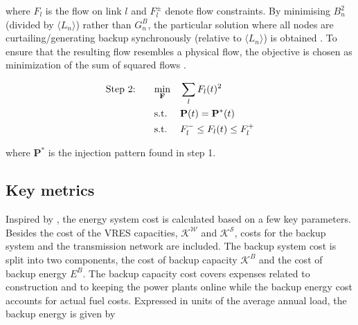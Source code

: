 \documentclass[a4paper, 5p, sort&compress]{elsarticle}%
\newcommand{\mean}[1]{\langle #1 \rangle}
\begin{document}
where $F_{l}$ is the flow on link $l$ and $F_{l}^{\pm}$ denote flow
constraints. By minimising $B_{n}^{2}$ (divided by $\mean{L_{n}}$)
rather than $G_{n}^{B}$, the particular solution where all nodes are
curtailing/generating backup synchronously (relative to
$\mean{L_{n}}$) is obtained
\cite{Rolando2015}. %
To ensure that the resulting flow resembles a physical flow, the
objective is chosen as minimization of the sum of squared flows
\cite{Magnus}.

\begin{equation}
  \begin{aligned}
    \label{eq:step2}
    \text{Step 2: \hspace{15pt}} & \underset{\mathbf{F}}{\text{min}}
    & & \sum_{l} F_{l}(t)^{2} \\
    & \text{s.t.}
    & & \mathbf{P}(t) = \mathbf{P}^{*}(t) \\ %
    & \text{s.t.}
    & & F_{l}^{-} \leq F_{l}(t) \leq F_{l}^{+} \\
  \end{aligned}
\end{equation}

where $\mathbf{P}^{*}$ is the injection pattern found in step 1.


\subsection{Key metrics}

Inspired by \cite{Sensitivity}, the energy system cost is calculated
based on a few key parameters. Besides the cost of the VRES
capacities, $\mathcal{K^{W}}$ and $\mathcal{K^S}$, costs for the
backup system and the transmission network are included. The backup
system cost is split into two components, the cost of backup capacity
$\mathcal{K}^{B}$ and the cost of backup energy $E^{B}$. The backup
capacity cost covers expenses related to construction and to keeping
the power plants online while the backup energy cost accounts for
actual fuel costs. Expressed in units of the average annual load, the
backup energy is given by
\end{document}
